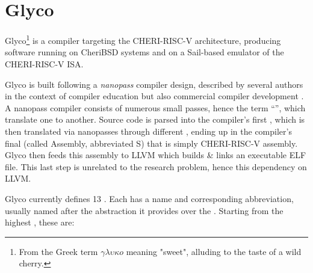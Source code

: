 \documentclass[main.tex]{subfiles}
\begin{document}
\onlyinsubfile{\mainmatter{}}

\chapter{Glyco}
Glyco\footnote{From the Greek term $\gamma\lambda\upsilon\kappa{}o$ meaning "sweet", alluding to the taste of a wild cherry.} is a compiler targeting the CHERI-RISC-V architecture, producing software running on CheriBSD systems and on a Sail-based emulator of the CHERI-RISC-V ISA.

Glyco is built following a \emph{nanopass} compiler design, described by several authors in the context of compiler education \cite{:educomp} but also commercial compiler development \cite{:commcomp}. A nanopass compiler consists of numerous small passes, hence the term \enquote{\nanopass{}}, which translate one \il{} to another. Source code is parsed into the compiler’s first \il{}, which is then translated via nanopasses through different \ils{}, ending up in the compiler's final \il{} (called Assembly, abbreviated S) that is simply CHERI-RISC-V assembly. Glyco then feeds this assembly to LLVM which builds \& links an executable ELF file. This last step is unrelated to the research problem, hence this dependency on LLVM.

Glyco currently defines 13 \ils{}. Each \il{} has a name and corresponding abbreviation, usually named after the abstraction it provides over the \lowerlang{}. Starting from the highest \il{}, these are:


\biblio{}
\onlyinsubfile{\glsaddall\printglossaries}
\end{document}
